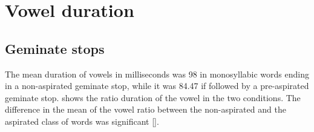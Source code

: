 \documentclass[11pt,a4paper,openany]{memoir}\usepackage[]{graphicx}\usepackage[]{color}
\begin{document}
\section{Vowel duration}
\label{s:vow-dur}

\subsection{Geminate stops}


The mean duration of vowels in milliseconds was 98 in monosyllabic words ending in a non-aspirated geminate stop, while it was 84.47 if followed by a pre-aspirated geminate stop.
 shows the ratio duration of the vowel in the two conditions.
The difference in the mean of the vowel ratio between the non-aspirated and the aspirated class of words was significant [].
\end{document}
